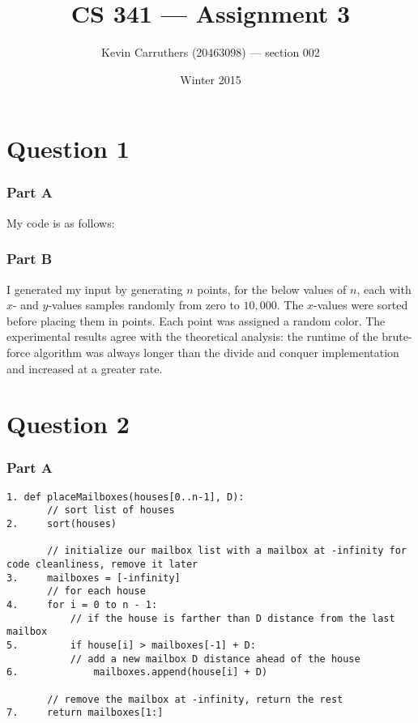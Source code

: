 \documentclass[12pt]{article}
\begin{document}
\title{CS 341 --- Assignment 3}
\author{Kevin Carruthers (20463098) --- section 002}
\date{\vspace{-2ex}Winter 2015}
\maketitle\HRule

\section*{Question 1}
\subsubsection*{Part A}
My code is as follows:


\subsubsection*{Part B}
I generated my input by generating $n$ points, for the below values of $n$, each with $x$- and $y$-values samples randomly from zero to $10,000$. The $x$-values were sorted before placing them in points. Each point was assigned a random color. The experimental results agree with the theoretical analysis: the runtime of the brute-force algorithm was always longer than the divide and conquer implementation and increased at a greater rate.


\section*{Question 2}
\subsubsection*{Part A}
\begin{verbatim}
1. def placeMailboxes(houses[0..n-1], D):
       // sort list of houses
2.     sort(houses)

       // initialize our mailbox list with a mailbox at -infinity for code cleanliness, remove it later
3.     mailboxes = [-infinity]
       // for each house
4.     for i = 0 to n - 1:
           // if the house is farther than D distance from the last mailbox
5.         if house[i] > mailboxes[-1] + D:
           // add a new mailbox D distance ahead of the house
6.             mailboxes.append(house[i] + D)

       // remove the mailbox at -infinity, return the rest
7.     return mailboxes[1:]
\end{verbatim}
\end{document}
